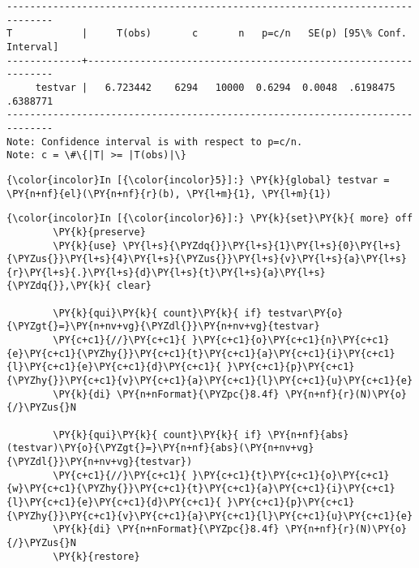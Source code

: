 \documentclass[11pt,notitlepage]{article}\usepackage[]{graphicx}\usepackage[]{color}
\makeatletter
\newenvironment{kframe}{%
 \def\at@end@of@kframe{}%
 \ifinner\ifhmode%
  \def\at@end@of@kframe{\end{minipage}}%
  \begin{minipage}{\columnwidth}%
 \fi\fi%
 \def\FrameCommand##1{\hskip\@totalleftmargin \hskip-\fboxsep
 \colorbox{shadecolor}{##1}\hskip-\fboxsep
     \hskip-\linewidth \hskip-\@totalleftmargin \hskip\columnwidth}%
 \MakeFramed {\advance\hsize-\width
   \@totalleftmargin\z@ \linewidth\hsize
   \@setminipage}}%
 {\par\unskip\endMakeFramed%
 \at@end@of@kframe}
\newenvironment{knitrout}{}{} %
\makeatother
\begin{document}
\begin{enumerate}[a)]
\begin{knitrout}
\begin{kframe}
\begin{Verbatim}[commandchars=\\\{\}]
------------------------------------------------------------------------------
T            |     T(obs)       c       n   p=c/n   SE(p) [95\% Conf. Interval]
-------------+----------------------------------------------------------------
     testvar |   6.723442    6294   10000  0.6294  0.0048  .6198475   .6388771
------------------------------------------------------------------------------
Note: Confidence interval is with respect to p=c/n.
Note: c = \#\{|T| >= |T(obs)|\}

    \end{Verbatim}

    \begin{Verbatim}[commandchars=\\\{\}]
{\color{incolor}In [{\color{incolor}5}]:} \PY{k}{global} testvar = \PY{n+nf}{el}(\PY{n+nf}{r}(b), \PY{l+m}{1}, \PY{l+m}{1})
\end{Verbatim}

    \begin{Verbatim}[commandchars=\\\{\}]
{\color{incolor}In [{\color{incolor}6}]:} \PY{k}{set}\PY{k}{ more} off
        \PY{k}{preserve}
        \PY{k}{use} \PY{l+s}{\PYZdq{}}\PY{l+s}{1}\PY{l+s}{0}\PY{l+s}{\PYZus{}}\PY{l+s}{4}\PY{l+s}{\PYZus{}}\PY{l+s}{v}\PY{l+s}{a}\PY{l+s}{r}\PY{l+s}{.}\PY{l+s}{d}\PY{l+s}{t}\PY{l+s}{a}\PY{l+s}{\PYZdq{}},\PY{k}{ clear}
        
        \PY{k}{qui}\PY{k}{ count}\PY{k}{ if} testvar\PY{o}{\PYZgt{}=}\PY{n+nv+vg}{\PYZdl{}}\PY{n+nv+vg}{testvar}
        \PY{c+c1}{//}\PY{c+c1}{ }\PY{c+c1}{o}\PY{c+c1}{n}\PY{c+c1}{e}\PY{c+c1}{\PYZhy{}}\PY{c+c1}{t}\PY{c+c1}{a}\PY{c+c1}{i}\PY{c+c1}{l}\PY{c+c1}{e}\PY{c+c1}{d}\PY{c+c1}{ }\PY{c+c1}{p}\PY{c+c1}{\PYZhy{}}\PY{c+c1}{v}\PY{c+c1}{a}\PY{c+c1}{l}\PY{c+c1}{u}\PY{c+c1}{e}        
        \PY{k}{di} \PY{n+nFormat}{\PYZpc{}8.4f} \PY{n+nf}{r}(N)\PY{o}{/}\PYZus{}N
        
        \PY{k}{qui}\PY{k}{ count}\PY{k}{ if} \PY{n+nf}{abs}(testvar)\PY{o}{\PYZgt{}=}\PY{n+nf}{abs}(\PY{n+nv+vg}{\PYZdl{}}\PY{n+nv+vg}{testvar})
        \PY{c+c1}{//}\PY{c+c1}{ }\PY{c+c1}{t}\PY{c+c1}{o}\PY{c+c1}{w}\PY{c+c1}{\PYZhy{}}\PY{c+c1}{t}\PY{c+c1}{a}\PY{c+c1}{i}\PY{c+c1}{l}\PY{c+c1}{e}\PY{c+c1}{d}\PY{c+c1}{ }\PY{c+c1}{p}\PY{c+c1}{\PYZhy{}}\PY{c+c1}{v}\PY{c+c1}{a}\PY{c+c1}{l}\PY{c+c1}{u}\PY{c+c1}{e}
        \PY{k}{di} \PY{n+nFormat}{\PYZpc{}8.4f} \PY{n+nf}{r}(N)\PY{o}{/}\PYZus{}N
        \PY{k}{restore}
\end{Verbatim}

    \begin{Verbatim}[commandchars=\\\{\}]


\end{Verbatim}
\end{kframe}
\end{knitrout}
\end{enumerate}
\end{document}
